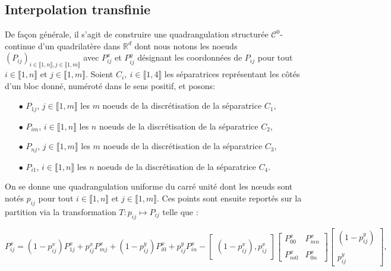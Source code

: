 \subsection{Interpolation transfinie}

De façon générale, il s'agit de construire une quadrangulation structurée $\mathcal{C}^0$-continue d'un quadrilatère dans $\mathbb{R}^d$ \cite{cook1974body} dont nous notons les noeuds $(P_{ij})_{i\in\llbracket 1, n\rrbracket, j\in\llbracket 1, m\rrbracket}$ avec $P_{ij}^x$ et $P_{ij}^y$ désignant les coordonnées de $P_{ij}$ pour tout $i\in\llbracket 1, n\rrbracket$ et $j\in\llbracket 1, m\rrbracket$. Soient $C_i,~i\in\llbracket 1, 4\rrbracket$ les séparatrices représentant les côtés d'un bloc donné, numéroté dans le sens positif, et posons:\\
\begin{itemize}
 \item[$\bullet$] $P_{1j}$, $j\in\llbracket 1, m\rrbracket$ les $m$ noeuds de la discrétisation de la séparatrice $C_1$,\\
 \item[$\bullet$] $P_{im}$, $i\in\llbracket 1, n\rrbracket$ les $n$ noeuds de la discrétisation de la séparatrice $C_2$,\\
 \item[$\bullet$] $P_{nj}$, $j\in\llbracket 1, m\rrbracket$ les $m$ noeuds de la discrétisation de la séparatrice $C_3$,\\
 \item[$\bullet$] $P_{i1}$, $i\in\llbracket 1, n\rrbracket$ les $n$ noeuds de la discrétisation de la séparatrice $C_4$.\\
\end{itemize}

 On se donne une quadrangulation uniforme du carré unité dont les nœuds sont notés $p_{ij}$ pour tout $i\in\llbracket 1, n\rrbracket$ et $j\in\llbracket 1, m\rrbracket$. Ces points sont ensuite reportés sur la partition via la transformation $T:p_{ij}\mapsto P_{ij}$ telle que :

$$
P_{ij}^x=(1-p_{ij}^x)P_{1j}^x+p_{ij}^xP_{mj}^x+(1-p_{ij}^y)P_{i0}^x+p_{ij}^y P_{in}^x-
\begin{bmatrix}
(1-p_{ij}^x), p_{ij}^x
\end{bmatrix}
\begin{bmatrix}
P_{00}^x&P_{mn}^x\\\\
P_{m0}^x&P_{0n}^x
\end{bmatrix}
\begin{bmatrix}
(1-p_{ij}^y)\\\\
p_{ij}^y
\end{bmatrix},
$$

